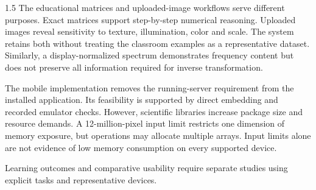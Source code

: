 \begin{spacing}{1.5}
The educational matrices and uploaded-image workflows serve different purposes. Exact matrices support step-by-step numerical reasoning. Uploaded images reveal sensitivity to texture, illumination, color and scale. The system retains both without treating the classroom examples as a representative dataset. Similarly, a display-normalized spectrum demonstrates frequency content but does not preserve all information required for inverse transformation.

The mobile implementation removes the running-server requirement from the installed application. Its feasibility is supported by direct embedding and recorded emulator checks. However, scientific libraries increase package size and resource demands. A 12-million-pixel input limit restricts one dimension of memory exposure, but operations may allocate multiple arrays. Input limits alone are not evidence of low memory consumption on every supported device.

Learning outcomes and comparative usability require separate studies using explicit tasks and representative devices.

\end{spacing}